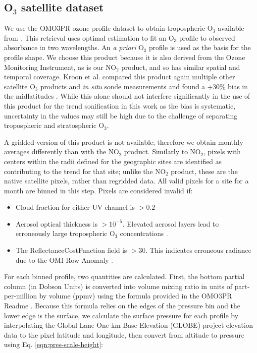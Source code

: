 \documentclass[a4paper,10pt,oneside]{article}
\newcommand{\ce}[1]{$\mathrm{#1}$}
\begin{document}
\begin{sloppy}
\subsection{O$_3$ satellite dataset}

	We use the OMO3PR ozone profile dataset to obtain tropospheric \ce{O_3} available from .   This retrieval uses optimal estimation to fit an \ce{O_3} profile to observed absorbance in two wavelengths. An \emph{a priori} \ce{O_3} profile is used as the basis for the profile shape.  We choose this product because it is also derived from the Ozone Monitoring Instrument, as is our \ce{NO_2} product, and so has similar spatial and temporal coverage. Kroon et al. compared this product again multiple other satellite \ce{O_3} products and \emph{in situ} sonde measurements and found a +30\% bias in the midlatitudes  \cite{kroon11}. While this alone should not interfere significantly in the use of this product for the trend sonification in this work as the bias is systematic, uncertainty in the values may still be high due to the challenge of separating tropospheric and stratospheric \ce{O_3}.
	
	A gridded version of this product is not available; therefore we obtain monthly averages differently than with the \ce{NO_2} product. Similarly to \ce{NO_2}, pixels with centers within the radii defined for the geographic sites are identified as contributing to the trend for that site; unlike the \ce{NO_2} product, these are the native satellite pixels, rather than regridded data. All valid pixels for a site for a month are binned in this step. Pixels are considered invalid if:
	
	\begin{itemize}
	\item Cloud fraction for either UV channel is $> 0.2$
	\item Aerosol optical thickness is $> 10^{-5}$. Elevated aerosol layers lead to erroneously large tropospheric \ce{O_3} concentrations \cite{omo3pr-readme}.
	\item The ReflectanceCostFunction field is $> 30$. This indicates erroneous radiance due to the OMI Row Anomaly \cite{row-anomaly}.
	\end{itemize}
	
	For each binned profile, two quantities are calculated. First, the bottom partial column (in Dobson Units) is converted into volume mixing ratio in units of part-per-million by volume (ppmv) using the formula provided in the OMO3PR Readme \cite{omo3pr-readme}. Because this formula relies on the edges of the pressure bin and the lower edge is the surface, we calculate the surface pressure for each profile by interpolating the Global Lane One-km Base Elevation (GLOBE) project elevation data \cite{globe} to the pixel latitude and longitude, then convert from altitude to pressure using Eq. \eqref{eqn:pres-scale-height}:
	

\end{sloppy}
\end{document}
